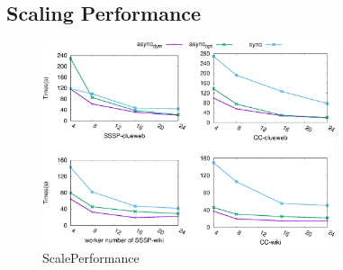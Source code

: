  \subsection{Scaling Performance}
 \label{sec:expr:scale}

\begin{figure}[!t]
	\vspace{0.0in}
	\centering
	\includegraphics[width=3.4in]{figuration/scale.eps}
	\vspace{-0.1in}
	\caption{ScalePerformance}
	\label{fig:scale}
	\vspace{-0.1in}
\end{figure}
